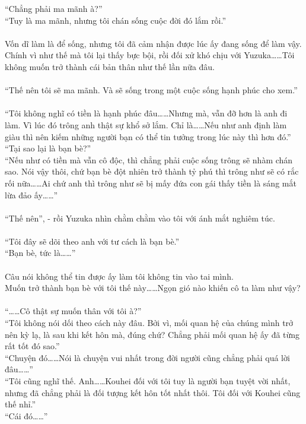 \documentclass[12pt,a4paper, twosides]{book}
\begin{document}
“Chẳng phải ma mãnh à?”\\
“Tuy là ma mãnh, nhưng tôi chán sống cuộc đời đó lắm rồi.”\\
\\
Vốn dĩ làm là để sống, nhưng tôi đã cảm nhận được lúc ấy đang sống để làm vậy. Chính vì như thế mà tôi lại thấy bực bội, rồi đối xử khó chịu với Yuzuka……Tôi không muốn trở thành cái bản thân như thế lần nữa đâu.\\
\\
“Thế nên tôi sẽ ma mãnh. Và sẽ sống trong một cuộc sống hạnh phúc cho xem.”\\
\\
“Tôi không nghĩ có tiền là hạnh phúc đâu……Nhưng mà, vẫn đỡ hơn là anh đi làm. Vì lúc đó trông anh thật sự khổ sở lắm. Chỉ là……Nếu như anh định làm giàu thì nên kiếm những người bạn có thể tin tưởng trong lúc này thì hơn đó.”\\
“Tại sao lại là bạn bè?”\\
“Nếu như có tiền mà vẫn cô độc, thì chẳng phải cuộc sống trông sẽ nhàm chán sao. Nói vậy thôi, chứ bạn bè đột nhiên trở thành tỷ phú thì trông như sẽ có rắc rối nữa……Ai chứ anh thì trông như sẽ bị mấy đứa con gái thấy tiền là sáng mắt lừa đảo ấy……”\\
\\
“Thế nên”, - rồi Yuzuka nhìn chằm chằm vào tôi với ánh mắt nghiêm túc.\\
\\
“Tôi đây sẽ dõi theo anh với tư cách là bạn bè.”\\
“Bạn bè, tức là……”\\
\\
Câu nói không thể tin được ấy làm tôi không tin vào tai mình.\\
Muốn trở thành bạn bè với tôi thế này……Ngọn gió nào khiến cô ta làm như vậy?\\
\\
“……Cô thật sự muốn thân với tôi à?”\\
“Tôi không nói dối theo cách này đâu. Bởi vì, mối quan hệ của chúng mình trở nên kỳ lạ, là sau khi kết hôn mà, đúng chứ? Chẳng phải mối quan hệ ấy đã từng rất tốt đó sao.”\\
“Chuyện đó……Nói là chuyện vui nhất trong đời người cũng chẳng phải quá lời đâu……”\\
“Tôi cũng nghĩ thế. Anh……Kouhei đối với tôi tuy là người bạn tuyệt vời nhất, nhưng đã chẳng phải là đối tượng kết hôn tốt nhất thôi. Tôi đối với Kouhei cũng thế nhỉ.”\\
“Cái đó……”\\
\end{document}
